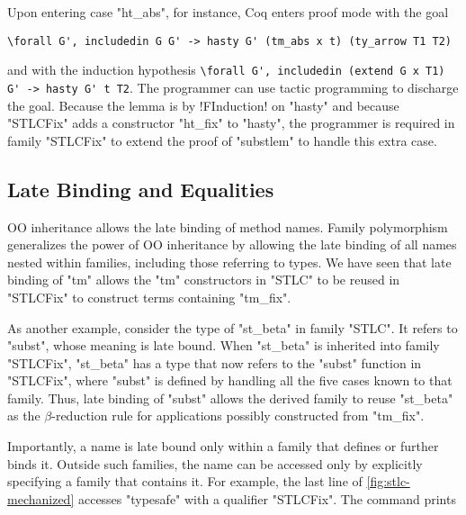 \noindent
Upon entering case "ht_abs", for instance, Coq enters proof mode with the goal

\begin{centered}
\begin{minipage}{.635\textwidth}
\begin{lstlisting}[basicstyle=\fontsize{8}{9}\ttfamily]
\forall G', includedin G G' -> hasty G' (tm_abs x t) (ty_arrow T1 T2)
\end{lstlisting}
\end{minipage}
\end{centered}

\noindent
and with the induction hypothesis
\lstinline[basicstyle=\fontsize{8}{9}\ttfamily]!\forall G', includedin (extend G x T1) G' -> hasty G' t T2!.
%
The programmer can use tactic programming to discharge the goal.
Because the lemma is by \lsti!FInduction! on "hasty" and because "STLCFix" adds
a constructor "ht_fix" to "hasty", the programmer is required in family "STLCFix" to
extend the proof of "substlem" to handle this extra case.


\subsection{Late Binding and Equalities}
\label{sec:latebind}


OO inheritance allows the late binding of method names.
Family polymorphism generalizes the power of OO inheritance by allowing the
late binding of all names nested within families, including those referring to types.
We have seen that late binding of "tm" allows the "tm" constructors in "STLC"
to be reused in "STLCFix" to construct terms containing "tm_fix".

As another example, consider the type of "st_beta" in family "STLC".
It refers to "subst", whose meaning is late bound.
When "st_beta" is inherited into family "STLCFix", "st_beta" has a type that now
refers to the "subst" function in "STLCFix", where "subst" is defined
by handling all the five cases known to that family.
Thus, late binding of "subst" allows the derived family to reuse "st_beta"
as the $\beta$-reduction rule for applications possibly constructed from "tm_fix".

Importantly, a name is late bound only within a family that defines or further binds it.
Outside such families, the name can be accessed only by explicitly
specifying a family that contains it.
For example, the last line of \cref{fig:stlc-mechanized} accesses "typesafe"
with a qualifier "STLCFix".
The command prints

